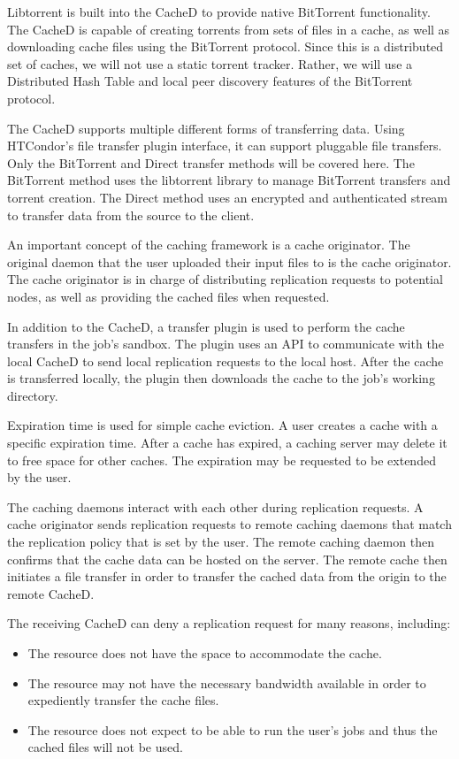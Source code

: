 Libtorrent \cite{nordberg2011rasterbar} is built into the CacheD to provide native BitTorrent functionality.  The CacheD is capable of creating torrents from sets of files in a cache, as well as downloading cache files using the BitTorrent protocol.  Since this is a distributed set of caches, we will not use a static torrent tracker.  Rather, we will use a Distributed Hash Table \cite{dinger2009decentralized} and local peer discovery \cite{legout2007clustering} features of the BitTorrent protocol.

\label{sec:cachedtransfermethods}
The CacheD supports multiple different forms of transferring data.  Using HTCondor's file transfer plugin interface, it can support pluggable file transfers.  Only the BitTorrent and Direct transfer methods will be covered here.  The BitTorrent method uses the libtorrent library to manage BitTorrent transfers and torrent creation.  The Direct method uses an encrypted and authenticated stream to transfer data from the source to the client.

An important concept of the caching framework is a cache originator.  The original daemon that the user uploaded their input files to is the cache originator.  The cache originator is in charge of distributing replication requests to potential nodes, as well as providing the cached files when requested.

In addition to the CacheD, a transfer plugin is used to perform the cache transfers in the job's sandbox.  The plugin uses an API to communicate with the local CacheD to send local replication requests to the local host.  After the cache is transferred locally, the plugin then downloads the cache to the job's working directory.

Expiration time is used for simple cache eviction.  A user creates a cache with a specific expiration time.  After a cache has expired, a caching server may delete it to free space for other caches.  The expiration may be requested to be extended by the user.

The caching daemons interact with each other during replication requests.  A cache originator sends replication requests to remote caching daemons that match the replication policy that is set by the user.  The remote caching daemon then confirms that the cache data can be hosted on the server.  The remote cache then initiates a file transfer in order to transfer the cached data from the origin to the remote CacheD.

The receiving CacheD can deny a replication request for many reasons, including:
\begin{itemize}
	\item The resource does not have the space to accommodate the cache.
	\item The resource may not have the necessary bandwidth available in order to expediently transfer the cache files.
	\item The resource does not expect to be able to run the user's jobs and thus the cached files will not be used.
\end{itemize}

